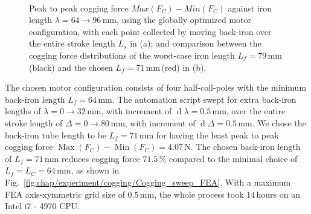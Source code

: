     
    \begin{figure}[h]
        \centering
        \\
        \caption{Peak to peak cogging force $Max(F_C) - Min(F_C )$ against iron length $\lambda = 64 \rightarrow 96 \,\mathrm{mm}$, using the globally optimized motor configuration, with each point collected by moving back-iron over the entire stroke length $L_s$ in (a); and comparison between the cogging force distributions of the worst-case iron length $L_f = 79\,\mathrm{mm}$\,(black) and the chosen $L_f = 71\,\mathrm{mm}$\,(red) in (b).}
    \end{figure}
    

    The chosen motor configuration consists of four half-coil-poles with the minimum back-iron length $L_f = 64\,\mathrm{mm}$. The automation script swept for extra back-iron lengths of $\lambda = 0 \rightarrow 32\,\mathrm{mm}$, with increment of $\operatorname d\lambda = 0.5\,\mathrm{mm}$, over the entire stroke length of $\Delta = 0 \rightarrow 80\,\mathrm{mm}$, with increment of $\operatorname d\Delta = 0.5\,\mathrm{mm}$. We chose the back-iron tube length to be $L_f = 71\,\mathrm{mm}$ for having the least peak to peak cogging force $\operatorname{Max}(F_C) - \operatorname{Min}(F_C ) = 4.07\,\mathrm{N}$. The chosen back-iron length of $L_f = 71\,\mathrm{mm}$ reduces cogging force $71.5\,\%$ compared to the minimal choice of $L_f = L_C = 64\,\mathrm{mm}$, as shown in  Fig.~\ref{fig:chap/experiment/cogging/Cogging_sweep_FEA}. With a maximum FEA axis-xymmetric grid size of $0.5\,\mathrm{mm}$, the whole process took $14$\,hours on an Intel i7 - 4970 CPU.


